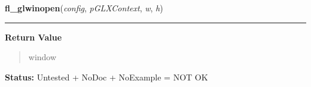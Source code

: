     \label{xformslib:library:fl_glwinopen}

    \vspace{0.5ex}

\hspace{.8\funcindent}\begin{boxedminipage}{\funcwidth}

    \raggedright \textbf{fl\_glwinopen}(\textit{config}, \textit{pGLXContext}, \textit{w}, \textit{h})

    \vspace{-1.5ex}

    \rule{\textwidth}{0.5\fboxrule}
\setlength{\parskip}{2ex}
\setlength{\parskip}{1ex}
      \textbf{Return Value}
    \vspace{-1ex}

      \begin{quote}
      window

      \end{quote}

\textbf{Status:} Untested + NoDoc + NoExample = NOT OK



    \end{boxedminipage}

    \label{xformslib:library:fl_add_chart}

    \vspace{0.5ex}

